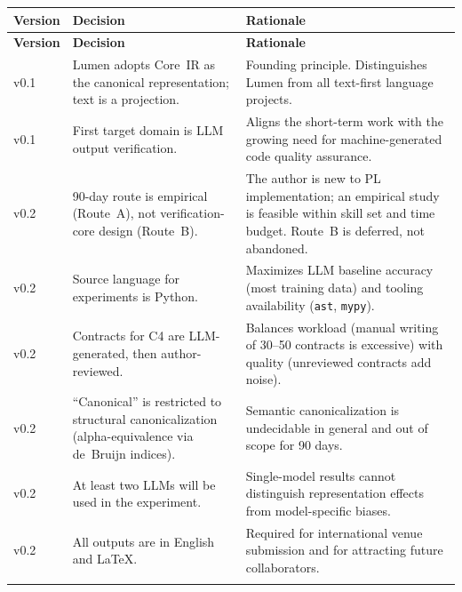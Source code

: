 \documentclass[11pt]{article}
\begin{document}
\begin{longtable}{@{}p{2cm}p{4cm}p{6.5cm}@{}}
  \toprule
  \textbf{Version} & \textbf{Decision} & \textbf{Rationale} \\
  \midrule
  \endfirsthead
  \toprule
  \textbf{Version} & \textbf{Decision} & \textbf{Rationale} \\
  \midrule
  \endhead

  v0.1 &
    Lumen adopts Core~IR as the canonical representation; text is a
    projection. &
    Founding principle.  Distinguishes Lumen from all text-first
    language projects. \\
  \addlinespace

  v0.1 &
    First target domain is LLM output verification. &
    Aligns the short-term work with the growing need for
    machine-generated code quality assurance. \\
  \addlinespace

  v0.2 &
    90-day route is empirical (Route~A), not verification-core
    design (Route~B). &
    The author is new to PL implementation; an empirical study is
    feasible within skill set and time budget.  Route~B is deferred,
    not abandoned. \\
  \addlinespace

  v0.2 &
    Source language for experiments is Python. &
    Maximizes LLM baseline accuracy (most training data) and
    tooling availability (\texttt{ast}, \texttt{mypy}). \\
  \addlinespace

  v0.2 &
    Contracts for C4 are LLM-generated, then author-reviewed. &
    Balances workload (manual writing of 30--50 contracts is
    excessive) with quality (unreviewed contracts add noise). \\
  \addlinespace

  v0.2 &
    ``Canonical'' is restricted to structural canonicalization
    (alpha-equivalence via de~Bruijn indices). &
    Semantic canonicalization is undecidable in general and out of
    scope for 90 days. \\
  \addlinespace

  v0.2 &
    At least two LLMs will be used in the experiment. &
    Single-model results cannot distinguish representation effects
    from model-specific biases. \\
  \addlinespace

  v0.2 &
    All outputs are in English and LaTeX. &
    Required for international venue submission and for attracting
    future collaborators. \\
  \addlinespace


\end{longtable}
\end{document}
